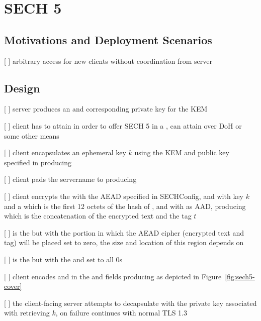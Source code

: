 \section{SECH 5}
\subsection{Motivations and Deployment Scenarios}

[ ] arbitrary access for new clients without coordination from server

\subsection{Design}

[ ] server produces an  and corresponding private key for the KEM

[ ] client has to attain  in order to offer SECH 5 in a , can attain over DoH or some other means

[ ] client encapsulates an ephemeral key $k$ using the KEM and public key specified in  producing 

[ ] client pads the servername to  producing \var{\paddedServername}

[ ] client encrypts the  with the AEAD specified in SECHConfig, and with key $k$ and a \nonce which is the first 12 octets of the hash of , and with  as AAD, producing  which is the concatenation of the encrypted text and the tag $t$

[ ]  is the  but with the portion in which the AEAD cipher (encrypted text and tag) will be placed set to zero, the size and location of this region depends on 

[ ]  is the  but with the  and  set to all 0s

[ ] client encodes  and  in the   and  fields producing  as depicted in Figure~\ref{fig:sech5-cover}

[ ] the client-facing server attempts to decapsulate  with the private key associated with  retrieving $k$, on failure continues with normal TLS 1.3

